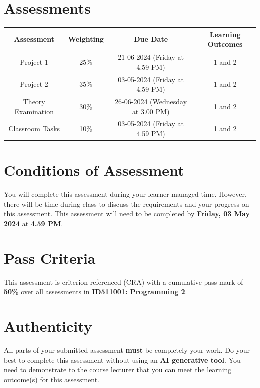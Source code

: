\documentclass{article}
\begin{document}
\section*{Assessments}
\renewcommand{\arraystretch}{1.5}
\begin{tabular}{|c|c|c|c|}
	\hline
	\textbf{Assessment}                                 & \textbf{Weighting} & \textbf{Due Date}            & \textbf{Learning Outcomes} \\ \hline
	\small Project 1 & \small 25\%        & \small 21-06-2024 (Friday at 4.59 PM)  & \small 1 and 2                   \\ \hline
	\small Project 2  & \small 35\%        & \small 03-05-2024 (Friday at 4.59 PM)   & \small 1 and 2                   \\ \hline
	\small Theory Examination                        & \small 30\%        & \small 26-06-2024 (Wednesday at 3.00 PM)  & \small 1 and 2                   \\ \hline
	\small Classroom Tasks                      & \small 10\%        & \small 03-05-2024 (Friday at 4.59 PM)  & \small 1 and 2                   \\ \hline
\end{tabular}

\section*{Conditions of Assessment}
You will complete this assessment during your learner-managed time. However, there will be time during class to discuss the requirements and your progress on this assessment. This assessment will need to be completed by \textbf{Friday, 03 May 2024} at \textbf{4.59 PM}.

\section*{Pass Criteria}
This assessment is criterion-referenced (CRA) with a cumulative pass mark of \textbf{50\%} over all assessments in \textbf{ID511001: Programming 2}.

\section*{Authenticity}
All parts of your submitted assessment \textbf{must} be completely your work. Do your best to complete this assessment without using an \textbf{AI generative tool}. You need to demonstrate to the course lecturer that you can meet the learning outcome(s) for this assessment. \\
 
\end{document}
